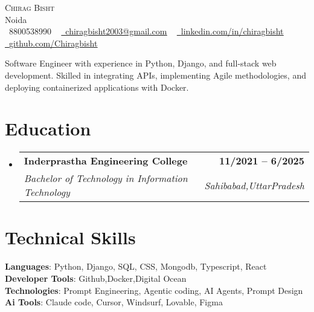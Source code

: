 \documentclass[letterpaper,11pt]{article}
\makeatletter
\newcommand{\resumeSubheading}[4]{
  \vspace{-2pt}\item
    \begin{tabular*}{1.0\textwidth}[t]{l@{\extracolsep{\fill}}r}
      \textbf{#1} & \textbf{\small #2} \\
      \textit{\small#3} & \textit{\small #4} \\
    \end{tabular*}\vspace{-7pt}
}
\newcommand{\resumeSubHeadingListStart}{\begin{itemize}[leftmargin=0.0in, label={}]}
\newcommand{\resumeSubHeadingListEnd}{\end{itemize}}
\makeatother
\begin{document}
\begin{center}
    {\Huge \scshape Chirag Bisht} \\ \vspace{3pt}
    Noida \\ \vspace{3pt}
    \small \raisebox{-0.1\height}\faPhone\ 8800538990 ~ \href{mailto:chiragbisht2003@gmail.com}{\raisebox{-0.2\height}\faEnvelope\  \underline{chiragbisht2003@gmail.com}} ~ 
    \href{https://www.linkedin.com/in/chiragbisht/}{\raisebox{-0.2\height}\faLinkedin\ \underline{linkedin.com/in/chiragbisht}}  ~
    \href{https://github.com/Chiragbisht}{\raisebox{-0.2\height}\faGithub\ \underline{github.com/Chiragbisht}}
    \vspace{-2pt}
\end{center}

\begin{itemize}[leftmargin=0.15in, label={}]
    \small{\item{
    Software Engineer with experience in Python, Django, and full-stack web development. Skilled in integrating APIs, implementing Agile methodologies, and deploying containerized applications with Docker.
    }}
\end{itemize}
\vspace{-10pt}

\section{Education}
  \resumeSubHeadingListStart
    \resumeSubheading
      {Inderprastha Engineering College}{11/2021 -- 6/2025}
      {Bachelor of Technology in Information Technology}{Sahibabad,UttarPradesh}
  \resumeSubHeadingListEnd

\section{Technical Skills}
 \begin{itemize}[leftmargin=0.15in, label={}]
    \small{\item{
     \textbf{Languages}{: Python, Django, SQL, CSS, Mongodb, Typescript, React} \\
     \textbf{Developer Tools}{: Github,Docker,Digital Ocean} \\
     \textbf{Technologies}{: Prompt Engineering, Agentic coding, AI Agents, Prompt Design} \\
     \textbf{Ai Tools}{: Claude code, Cursor, Windsurf, Lovable, Figma} 
    }}
 \end{itemize}
 \vspace{-12pt}
\end{document}
